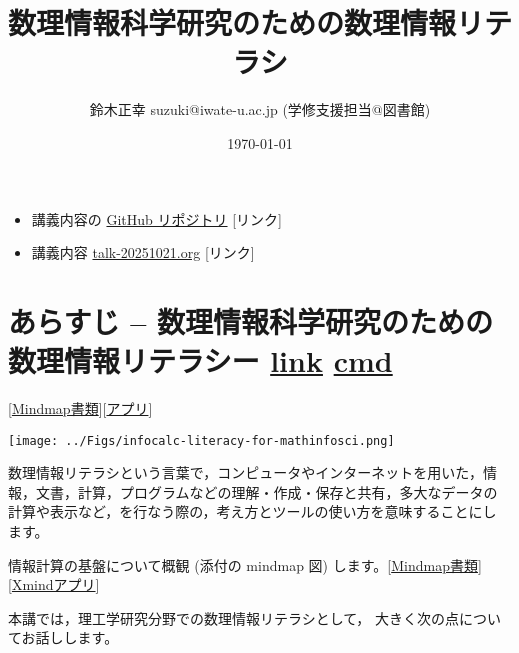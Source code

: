 \documentclass[dvipdfmx,11pat]{jarticle}
\author{鈴木正幸 suzuki@iwate-u.ac.jp (学修支援担当@図書館)}
\date{\today}
\title{ 数理情報科学研究のための数理情報リテラシ}
\begin{document}
\maketitle
\begin{itemize}
\item 講義内容の \href{https://github.com/masayuki054/comp\_and\_cal/}{GitHub リポジトリ} {[}リンク]
\item 講義内容 \href{https://github.com/masayuki054/comp\_and\_cal/blob/master/org/talk-20251021.org}{talk-20251021.org} {[}リンク]
\end{itemize}
\section{あらすじ -- 数理情報科学研究のための数理情報リテラシー \href{../Maps/数理情報科学のための情報計算リテラシー.xmind}{link} \href{shell:xmind ../Maps/数理情報科学のための情報計算リテラシー.xmind}{cmd}}
\label{sec:org910cb55}

{[}\href{../Maps/数理情報科学のための情報計算リテラシー.xmind}{Mindmap書類}][\href{shell:xmind :../Maps/数理情報科学のための情報計算リテラシー.xmind}{アプリ}]
\begin{center}
\texttt{[image: ../Figs/infocalc-literacy-for-mathinfosci.png]}
\end{center}

数理情報リテラシという言葉で，コンピュータやインターネットを用いた，情
報，文書，計算，プログラムなどの理解・作成・保存と共有，多大なデータの
計算や表示など，を行なう際の，考え方とツールの使い方を意味することにし
ます。

情報計算の基盤について概観 (添付の mindmap 図) します。[\href{./Maps/ICTの利用目的.xmind}{Mindmap書類}][\href{shell:open ../Maps/ICTの利用目 的.xmind}{Xmindアプリ}]

本講では，理工学研究分野での数理情報リテラシとして，
大きく次の点についてお話しします。
\end{document}

